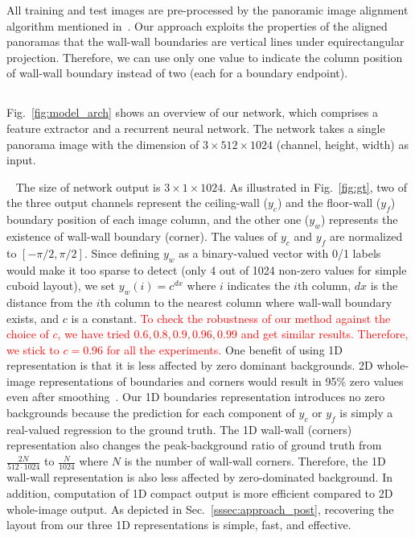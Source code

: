 \documentclass[10pt,twocolumn,letterpaper]{article}
\makeatletter
\renewcommand{\paragraph}{\@startsection{paragraph}{4}{\z@}{0\baselineskip \@plus 0ex \@minus 0ex}{-0em}{\normalfont\normalsize\bfseries}}
\newcommand{\revise}[1]{\textcolor{red}{#1}}
\newcommand{\revise}[1]{#1}
\makeatother
\begin{document}
All training and test images are pre-processed by the panoramic image alignment algorithm mentioned in~\cite{zou2018layoutnet}. Our approach exploits the properties of the aligned panoramas that the wall-wall boundaries are vertical lines under equirectangular projection. Therefore, we can use only one value to indicate the column position of wall-wall boundary instead of two (each for a boundary endpoint).


\subsection{\modelname} \label{sssec:approach_net}

Fig.~\ref{fig:model_arch} shows an overview of our network, which comprises a feature extractor and a recurrent neural network. The network takes a single panorama image with the dimension of $3 \times 512 \times 1024$ (channel, height, width) as input.

\paragraph{1D Layout Representation:} ~ The size of network output is $3 \times 1 \times 1024$.
As illustrated in Fig.~\ref{fig:gt}, two of the three output channels represent the ceiling-wall ($y_c$) and the floor-wall ($y_f$) boundary position of each image column, and the other one ($y_w$) represents the existence of wall-wall boundary (\ie corner). The values of $y_c$ and $y_f$ are normalized to $[-\pi/2, \pi/2]$.
Since defining $y_w$ as a binary-valued vector with 0/1 labels would make it too sparse to detect (only 4 out of 1024 non-zero values for simple cuboid layout), we set $y_w(i) = c^{dx}$ where $i$ indicates the $i$th column, $dx$ is the distance from the $i$th column to the nearest column where wall-wall boundary exists, and $c$ is a constant.
\revise{To check the robustness of our method against the choice of $c$, we have tried $0.6, 0.8, 0.9, 0.96, 0.99$ and get similar results. Therefore, we stick to $c=0.96$ for all the experiments.}
One benefit of using 1D representation is that it is less affected by zero dominant backgrounds.
2D whole-image representations of boundaries and corners would result in 95\% zero values even after smoothing~\cite{zou2018layoutnet}.
Our 1D boundaries representation introduces no zero backgrounds because the prediction for each component of $y_c$ or $y_f$ is simply a real-valued regression to the ground truth.
The 1D wall-wall (corners) representation also changes the peak-background ratio of ground truth from $\frac{2N}{512 \cdot 1024}$ to $\frac{N}{1024}$ where $N$ is the number of wall-wall corners.
Therefore, the 1D wall-wall representation is also less affected by zero-dominated background.
In addition, computation of 1D compact output is more efficient compared to 2D whole-image output.
As depicted in Sec.~\ref{sssec:approach_post}, recovering the layout from our three 1D representations is simple, fast, and effective.
\end{document}
